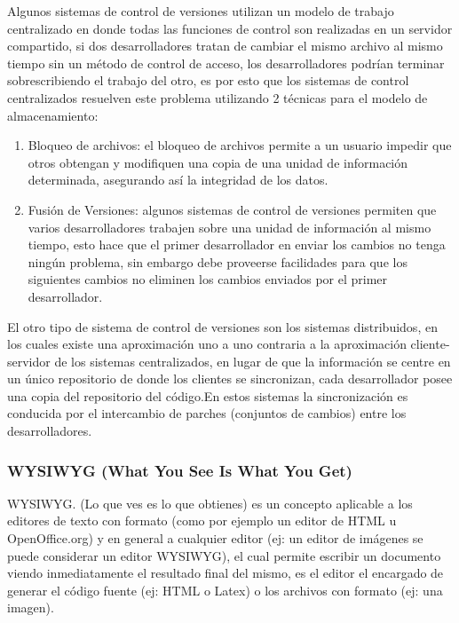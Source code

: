 Algunos sistemas de control de versiones utilizan un modelo de trabajo centralizado en donde todas las funciones de control son realizadas en un servidor compartido, si dos desarrolladores tratan de cambiar el mismo archivo al mismo tiempo sin un método de control de acceso, los desarrolladores podrían terminar sobrescribiendo el trabajo del otro, es por esto que los sistemas de control centralizados resuelven este problema utilizando 2 técnicas para el modelo de almacenamiento:

\begin{enumerate}

	\item Bloqueo de archivos: el bloqueo de archivos permite a un usuario impedir que otros obtengan y modifiquen una copia de una unidad de información determinada, asegurando así la integridad de los datos.
	
	\item Fusión de Versiones: algunos sistemas de control de versiones permiten que varios desarrolladores trabajen sobre una unidad de información al mismo tiempo, esto hace que el primer desarrollador en enviar los cambios no tenga ningún problema, sin embargo debe proveerse facilidades para que los siguientes cambios no eliminen los cambios enviados por el primer desarrollador.

\end{enumerate}

El otro tipo de sistema de control de versiones son los sistemas distribuidos, en los cuales existe una aproximación uno a uno contraria a la aproximación cliente-servidor de los sistemas centralizados, en lugar de que la información se centre en un único repositorio de donde los clientes se sincronizan, cada desarrollador posee una copia del repositorio del código.\newline En estos sistemas la sincronización es conducida por el intercambio de parches (conjuntos de cambios) entre los desarrolladores.

\subsubsection*{WYSIWYG (What You See Is What You Get)}

WYSIWYG. (Lo que ves es lo que obtienes) es un concepto aplicable a los editores de texto con formato (como por ejemplo un editor de HTML u OpenOffice.org) y en general a cualquier editor (ej: un editor de imágenes se puede considerar un editor WYSIWYG), el cual permite escribir un documento viendo inmediatamente el resultado final del mismo, es el editor el encargado de generar el código fuente (ej: HTML o Latex) o los archivos con formato (ej: una imagen).

